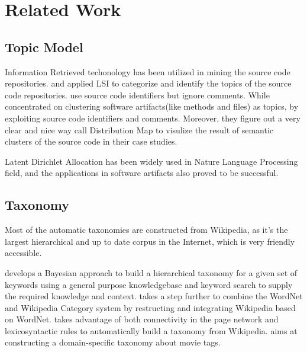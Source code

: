 \vfill\eject
\section{Related Work}
\label{sec:related}

\subsection{Topic Model}
\label{sec:relatedtm}
Information Retrieved techonology has been utilized in mining the source code repositories. \cite{kawaguchi2006mudablue} and \cite{kuhn2007semantic} applied LSI to categorize and identify the topics of the source code repositories. \cite{kawaguchi2006mudablue} use source code identifiers but ignore comments. While \cite{kuhn2007semantic} concentrated on clustering software artifacts(like methods and files) as topics, by exploiting source code identifiers and comments. Moreover, they figure out a very clear and nice way call Distribution Map to visulize the result of semantic clusters of the source code in their case studies.

Latent Dirichlet Allocation has been widely used in Nature Language Processing field, and the applications\cite{baldi2008theory, linstead2007mining, lukins2008source, maskeri2008mining} in software artifacts also proved to be successful.

\subsection{Taxonomy}
\label{sec:relatedtax}
Most of the automatic taxonomies are constructed from Wikipedia, as it's the largest hierarchical and up to date corpus in the Internet, which is very friendly accessible.

\cite{liu2012automatic} develops a Bayesian approach to build a hierarchical taxonomy for a given set of keywords using a general purpose knowledgebase and keyword search to supply the required knowledge and context.
\cite{ponzetto2009large} takes a step further to combine the WordNet\cite{miller1995wordnet} and Wikipedia Category system by restructing and integrating Wikipedia based on WordNet.
\cite{ponzetto2007deriving} takes advantage of both connectivity in the page network and lexicosyntactic rules to automatically build a taxonomy from Wikipedia. 
\cite{kotlerman2011support} aims at constructing a domain-specific taxonomy about movie tags.